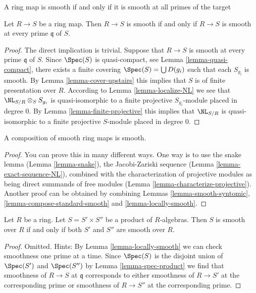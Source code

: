 \begin{lemma}
\label{lemma-locally-smooth}
\begin{slogan}
A ring map is smooth if and only if it is smooth at all primes of the target
\end{slogan}
Let $R \to S$ be a ring map.
Then $R \to S$ is smooth if and only if $R \to S$ is smooth
at every prime $\mathfrak q$ of $S$.
\end{lemma}

\begin{proof}
The direct implication is trivial. Suppose that $R \to S$ is smooth
at every prime $\mathfrak q$ of $S$. Since $\Spec(S)$ is
quasi-compact, see Lemma \ref{lemma-quasi-compact},
there exists a finite covering
$\Spec(S) = \bigcup D(g_i)$ such that each $S_{g_i}$ is
smooth. By Lemma \ref{lemma-cover-upstairs} this implies that
$S$ is of finite presentation over $R$. According to
Lemma \ref{lemma-localize-NL} we see that
$\NL_{S/R} \otimes_S S_{g_i}$ is quasi-isomorphic to a finite projective
$S_{g_i}$-module placed in degree $0$. By Lemma \ref{lemma-finite-projective}
this implies that $\NL_{S/R}$ is quasi-isomorphic to a finite
projective $S$-module placed in degree $0$.
\end{proof}

\begin{lemma}
\label{lemma-compose-smooth}
A composition of smooth ring maps is smooth.
\end{lemma}

\begin{proof}
You can prove this in many different ways. One way is to use
the snake lemma (Lemma \ref{lemma-snake}), the Jacobi-Zariski sequence
(Lemma \ref{lemma-exact-sequence-NL}), combined with the
characterization of projective modules as being
direct summands of free modules (Lemma \ref{lemma-characterize-projective}).
Another proof can be obtained by combining
Lemmas \ref{lemma-smooth-syntomic}, \ref{lemma-compose-standard-smooth}
and \ref{lemma-locally-smooth}.
\end{proof}

\begin{lemma}
\label{lemma-product-smooth}
Let $R$ be a ring. Let $S = S' \times S''$ be a product of $R$-algebras.
Then $S$ is smooth over $R$ if and only if both $S'$ and $S''$ are
smooth over $R$.
\end{lemma}

\begin{proof}
Omitted. Hints: By Lemma \ref{lemma-locally-smooth} we can check smoothness
one prime at a time. Since $\Spec(S)$ is the disjoint union of
$\Spec(S')$ and $\Spec(S'')$ by Lemma \ref{lemma-spec-product}
we find that smoothness of $R \to S$ at $\mathfrak q$ corresponds
to either smoothness of $R \to S'$ at the corresponding prime or
smoothness of $R \to S''$ at the corresponding prime.
\end{proof}

